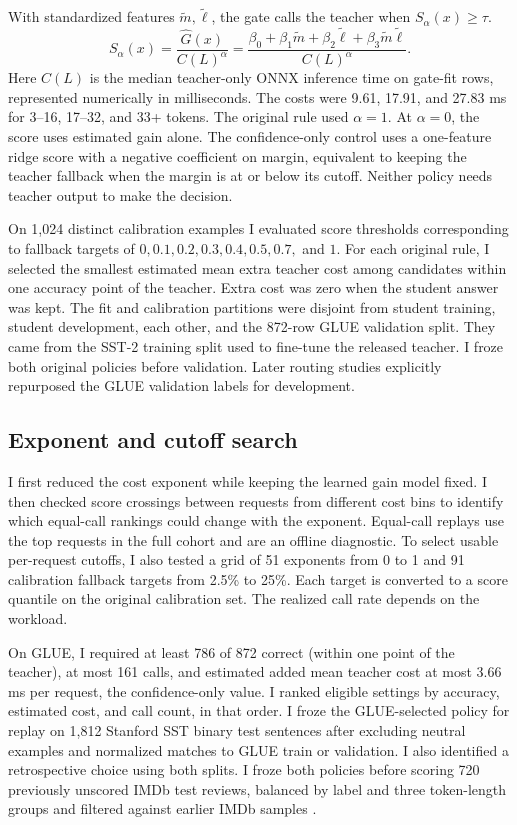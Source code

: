 \documentclass{article}
\begin{document}
With standardized features \(\tilde m,\tilde\ell\), the gate calls the teacher when \(S_\alpha(x)\geq\tau\).
\begin{equation}
 S_\alpha(x) = \frac{\widehat G(x)}{C(L)^\alpha} =
 \frac{\beta_0+\beta_1\tilde m+\beta_2\tilde\ell+\beta_3\tilde m\tilde\ell}{C(L)^\alpha}.
 \label{eq:score}
\end{equation}
Here \(C(L)\) is the median teacher-only ONNX inference time on gate-fit rows, represented numerically in milliseconds. The costs were 9.61, 17.91, and 27.83 ms for 3--16, 17--32, and 33+ tokens. The original rule used \(\alpha=1\). At \(\alpha=0\), the score uses estimated gain alone. The confidence-only control uses a one-feature ridge score with a negative coefficient on margin, equivalent to keeping the teacher fallback when the margin is at or below its cutoff. Neither policy needs teacher output to make the decision.

On 1,024 distinct calibration examples I evaluated score thresholds corresponding to fallback targets of \(0, 0.1, 0.2, 0.3, 0.4, 0.5, 0.7,\) and \(1\). For each original rule, I selected the smallest estimated mean extra teacher cost among candidates within one accuracy point of the teacher. Extra cost was zero when the student answer was kept. The fit and calibration partitions were disjoint from student training, student development, each other, and the 872-row GLUE validation split. They came from the SST-2 training split used to fine-tune the released teacher. I froze both original policies before validation. Later routing studies explicitly repurposed the GLUE validation labels for development.

\subsection{Exponent and cutoff search}
I first reduced the cost exponent while keeping the learned gain model fixed. I then checked score crossings between requests from different cost bins to identify which equal-call rankings could change with the exponent. Equal-call replays use the top requests in the full cohort and are an offline diagnostic. To select usable per-request cutoffs, I also tested a grid of 51 exponents from 0 to 1 and 91 calibration fallback targets from 2.5\% to 25\%. Each target is converted to a score quantile on the original calibration set. The realized call rate depends on the workload.

On GLUE, I required at least 786 of 872 correct (within one point of the teacher), at most 161 calls, and estimated added mean teacher cost at most 3.66 ms per request, the confidence-only value. I ranked eligible settings by accuracy, estimated cost, and call count, in that order. I froze the GLUE-selected policy for replay on 1,812 Stanford SST binary test sentences after excluding neutral examples and normalized matches to GLUE train or validation. I also identified a retrospective choice using both splits. I froze both policies before scoring 720 previously unscored IMDb test reviews, balanced by label and three token-length groups and filtered against earlier IMDb samples \citep{maas2011}.
\end{document}
